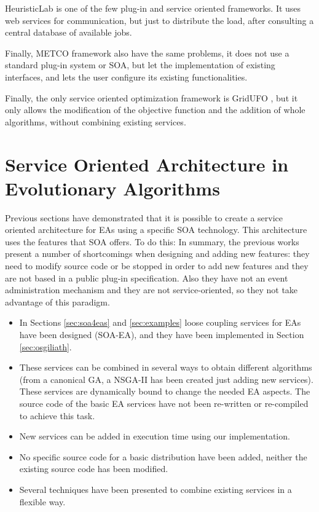 \documentclass{sig-alternate}
\begin{document}
HeuristicLab \cite{HEURISTICLAB} is one of the few plug-in and service oriented frameworks. It uses web services for communication, but just to distribute the load, after consulting a central database of available jobs.

Finally, METCO framework \cite{METCO} also have the same problems, it does not use a standard plug-in system or SOA, but let the implementation of existing interfaces, and lets the user configure its existing functionalities.



Finally, the only service oriented optimization framework is GridUFO \cite{GRIDUFO}, but it only allows the modification of the objective function and the addition of whole algorithms, without combining existing services. 

\section{Service Oriented Architecture in Evolutionary Algorithms}
Previous sections have demonstrated that it is possible to create a service oriented architecture for EAs using a specific SOA technology. This architecture uses the features that SOA offers. To do this:
In summary, the previous works present a number of shortcomings when designing and adding new features: they need to modify source code or be stopped in order to add new features and they are not based in a public plug-in specification. Also they have not an event administration mechanism and they are not service-oriented, so they not take advantage of this paradigm.
\begin{itemize}
\item In Sections \ref{sec:soa4eas} and \ref{sec:examples} loose coupling services for EAs have been designed (SOA-EA), and they have been implemented in Section \ref{sec:osgiliath}.
\item These services can be combined in several ways to obtain different algorithms (from a canonical GA, a NSGA-II has been created just adding new services). These services are dynamically bound to cha\-nge the needed EA aspects. The source code of  the basic EA services have not been re-written or re-compiled to achieve this task.
\item New services can be added in execution time using our implementation.
\item No specific source code for a basic distribution have been added, neither the existing source code has been modified.
\item Several techniques have been presented to combine existing services in a flexible way.
\end{itemize}
\end{document}
